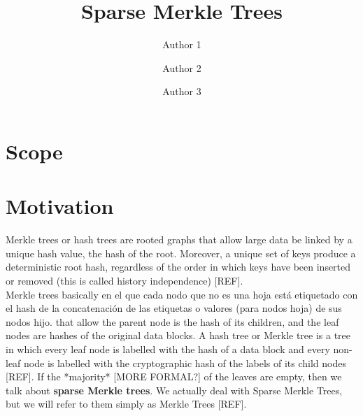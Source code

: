 \documentclass[11pt]{article}
\title{ Sparse Merkle Trees \vspace{-0.2cm} }
\author[1]{Author 1}
\author[2]{Author 2}
\author[1]{Author 3}
\affil[1]{Affiliation 1}
\affil[2]{Affiliation 2}
\date{} %
\begin{document}
\maketitle 
\vspace{1cm}
\tableofcontents

\vspace{0.5cm}


\section{Scope}						%

	
\section{Motivation}				%

Merkle trees or hash trees are %
rooted graphs that allow large data be linked by a unique hash value, the hash of the root. Moreover,  a unique set of keys produce a deterministic root hash, regardless of the order in which keys have
been inserted or removed (this is called history independence) [REF].\\

Merkle trees basically en el que cada nodo que no es una hoja está etiquetado con el hash de la concatenación de las etiquetas o valores (para nodos hoja) de sus nodos hijo.
that allow the parent node is the hash of its children, and the leaf nodes are hashes of the original data blocks. A hash tree or Merkle tree is a tree in which every leaf node is labelled with the hash of a data block and every non-leaf node is labelled with the cryptographic hash of the labels of its child nodes [REF]. %
If the *majority* [MORE FORMAL?] of the leaves are empty, then we talk about {\bf sparse Merkle trees}. We actually deal with Sparse Merkle Trees, but we will refer to them simply as Merkle Trees [REF].\\
\end{document}
